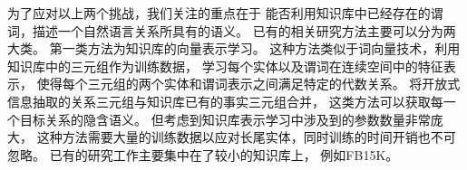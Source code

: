 





为了应对以上两个挑战，我们关注的重点在于
能否利用知识库中已经存在的谓词，描述一个自然语言关系所具有的语义。
已有的相关研究方法主要可以分为两大类。
第一类方法为知识库的向量表示学习。
这种方法类似于词向量技术，利用知识库中的三元组作为训练数据，
学习每个实体以及谓词在连续空间中的特征表示，
使得每个三元组的两个实体和谓词表示之间满足特定的代数关系。
将开放式信息抽取的关系三元组与知识库已有的事实三元组合并，
这类方法可以获取每一个目标关系的隐含语义。
但考虑到知识库表示学习中涉及到的参数数量非常庞大，
这种方法需要大量的训练数据以应对长尾实体，同时训练的时间开销也不可忽略。
已有的研究工作主要集中在了较小的知识库上，
例如FB15K\cite{bordes2013translating,toutanova2015representing}。

